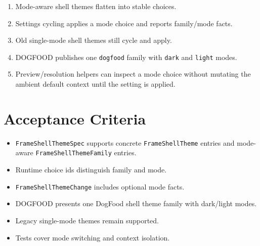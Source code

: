 \begin{enumerate}
\def\labelenumi{\arabic{enumi}.}
\tightlist
\item
  Mode-aware shell themes flatten into stable choices.
\item
  Settings cycling applies a mode choice and reports family/mode facts.
\item
  Old single-mode shell themes still cycle and apply.
\item
  DOGFOOD publishes one \texttt{d\allowbreak{}o\allowbreak{}g\allowbreak{}f\allowbreak{}o\allowbreak{}o\allowbreak{}d} family with \texttt{d\allowbreak{}a\allowbreak{}r\allowbreak{}k} and \texttt{l\allowbreak{}i\allowbreak{}g\allowbreak{}h\allowbreak{}t} modes.
\item
  Preview/resolution helpers can inspect a mode choice without mutating the ambient default context until the setting is applied.
\end{enumerate}

\section{Acceptance Criteria}\label{record-181-acceptance-criteria}

\begin{itemize}
\tightlist
\item[$\square$]
  \texttt{F\allowbreak{}r\allowbreak{}a\allowbreak{}m\allowbreak{}e\allowbreak{}S\allowbreak{}h\allowbreak{}e\allowbreak{}l\allowbreak{}l\allowbreak{}T\allowbreak{}h\allowbreak{}e\allowbreak{}m\allowbreak{}e\allowbreak{}S\allowbreak{}p\allowbreak{}e\allowbreak{}c} supports concrete \texttt{F\allowbreak{}r\allowbreak{}a\allowbreak{}m\allowbreak{}e\allowbreak{}S\allowbreak{}h\allowbreak{}e\allowbreak{}l\allowbreak{}l\allowbreak{}T\allowbreak{}h\allowbreak{}e\allowbreak{}m\allowbreak{}e} entries and mode-aware \texttt{F\allowbreak{}r\allowbreak{}a\allowbreak{}m\allowbreak{}e\allowbreak{}S\allowbreak{}h\allowbreak{}e\allowbreak{}l\allowbreak{}l\allowbreak{}T\allowbreak{}h\allowbreak{}e\allowbreak{}m\allowbreak{}e\allowbreak{}F\allowbreak{}a\allowbreak{}m\allowbreak{}i\allowbreak{}l\allowbreak{}y} entries.
\item[$\square$]
  Runtime choice ids distinguish family and mode.
\item[$\square$]
  \texttt{F\allowbreak{}r\allowbreak{}a\allowbreak{}m\allowbreak{}e\allowbreak{}S\allowbreak{}h\allowbreak{}e\allowbreak{}l\allowbreak{}l\allowbreak{}T\allowbreak{}h\allowbreak{}e\allowbreak{}m\allowbreak{}e\allowbreak{}C\allowbreak{}h\allowbreak{}a\allowbreak{}n\allowbreak{}g\allowbreak{}e} includes optional mode facts.
\item[$\square$]
  DOGFOOD presents one DogFood shell theme family with dark/light modes.
\item[$\square$]
  Legacy single-mode themes remain supported.
\item[$\square$]
  Tests cover mode switching and context isolation.
\end{itemize}

